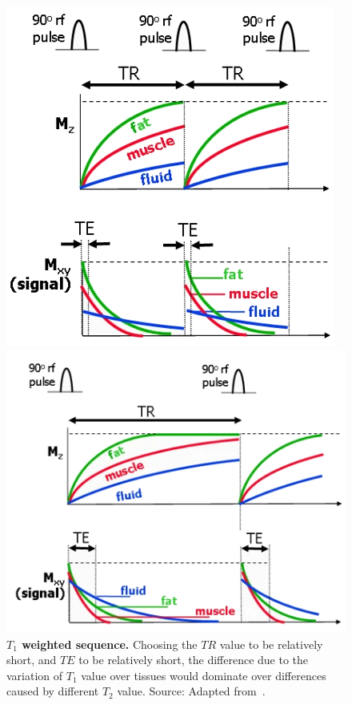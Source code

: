 \begin{figure}[thb]
    \centering
    \begin{minipage}[t]{.28\textwidth}
        \centering
        \includegraphics[width=.8\linewidth]{images/T1_weighted.png}
        \caption{\textbf{$T_1$ weighted sequence.} Choosing the $TR$ value to be relatively short, and $TE$ to be relatively short, the difference due to the variation of $T_1$ value over tissues would dominate over differences caused by different $T_2$ value. Source: Adapted from~\cite{ridgway_cardiovascular_2010}.}
        \label{fig:T1_weighted}
    \end{minipage}%
    \hspace{0.02\textwidth}
    \begin{minipage}[t]{.28\textwidth}
        \centering
        \includegraphics[width=\linewidth]{images/T2_weighted.png}

\end{minipage}
\end{figure}
